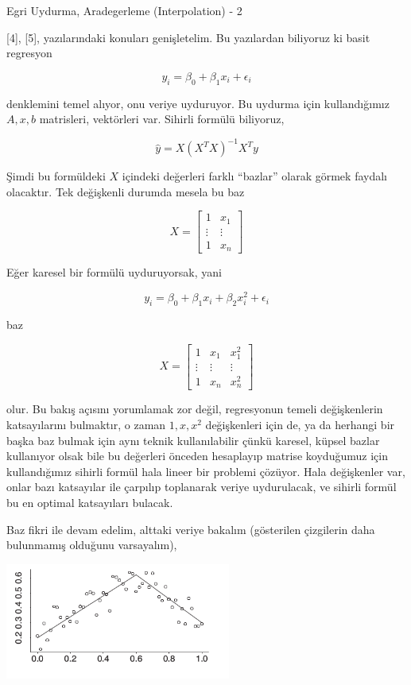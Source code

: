 \documentclass[12pt,fleqn]{article}\usepackage{../../common}
\begin{document}
Egri Uydurma, Aradegerleme (Interpolation) - 2

[4], [5], yazılarındaki konuları genişletelim. Bu yazılardan biliyoruz ki basit
regresyon

$$ y_i = \beta_0 + \beta_1 x_i + \epsilon_i$$

denklemini temel alıyor, onu veriye uyduruyor. Bu uydurma için
kullandığımız $A,x,b$ matrisleri, vektörleri var. Sihirli formülü
biliyoruz, 

$$ \hat{y} = X(X^TX)^{-1}X^Ty $$

Şimdi bu formüldeki $X$ içindeki değerleri farklı ``bazlar'' olarak görmek
faydalı olacaktır. Tek değişkenli durumda mesela bu baz

$$ X = 
\left[\begin{array}{cc}
1 & x_1 \\ \vdots & \vdots \\ 1 & x_n
\end{array}\right]
$$

Eğer karesel bir formülü uyduruyorsak, yani

$$ y_i = \beta_0 + \beta_1x_i + \beta_2x_i^2 + \epsilon_i $$

baz 

$$ X = 
\left[\begin{array}{ccc}
1 & x_1 & x_1^2\\ 
\vdots & \vdots & \vdots \\
1 & x_n & x_n^2
\end{array}\right]
$$

olur. Bu bakış açısını yorumlamak zor değil, regresyonun temeli
değişkenlerin katsayılarını bulmaktır, o zaman $1,x,x^2$ değişkenleri için
de, ya da herhangi bir başka baz bulmak için aynı teknik kullanılabilir
çünkü karesel, küpsel bazlar kullanıyor olsak bile bu değerleri önceden
hesaplayıp matrise koyduğumuz için kullandığımız sihirli formül hala lineer
bir problemi çözüyor. Hala değişkenler var, onlar bazı katsayılar ile
çarpılıp toplanarak veriye uydurulacak, ve sihirli formül bu en optimal
katsayıları bulacak.

Baz fikri ile devam edelim, alttaki veriye bakalım (gösterilen çizgilerin
daha bulunmamış olduğunu varsayalım),

\includegraphics[width=20em]{compscieng_app20_04.png}
\end{document}
